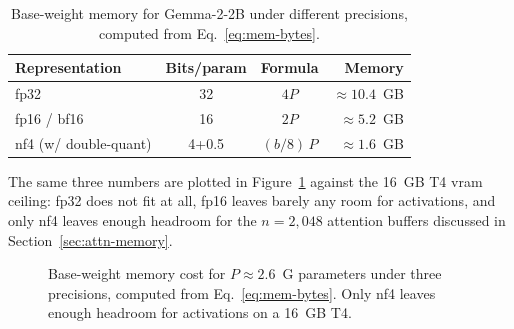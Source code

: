 \documentclass[12pt, a4paper]{report}
\begin{document}
\begin{table}[H]
  \centering
  \caption{Base-weight memory for Gemma-2-2B under different precisions,
           computed from Eq.~\eqref{eq:mem-bytes}.}
  \label{tab:vram-budget}
  \begin{tabular}{@{}lccr@{}}
    \toprule
    \textbf{Representation} & \textbf{Bits/param} & \textbf{Formula} & \textbf{Memory} \\
    \midrule
    fp32                       & 32   & \(4 P\)           & \(\approx 10.4\)~GB \\
    fp16 / bf16                & 16   & \(2 P\)           & \(\approx 5.2\)~GB  \\
    \gls{nf4} (w/ double-quant) & 4{+}0.5 & \((b/8)\,P\) & \(\approx 1.6\)~GB  \\
    \bottomrule
  \end{tabular}
\end{table}

The same three numbers are plotted in Figure~\ref{fig:mem-budget}
against the 16~GB T4 \gls{vram} ceiling: fp32 does not fit at all,
fp16 leaves barely any room for activations, and only \gls{nf4} leaves
enough headroom for the \(n=2{,}048\) attention buffers discussed in
Section~\ref{sec:attn-memory}.

\begin{figure}[H]
  \centering
  \caption[Base-weight memory]{Base-weight memory cost for
           \(P \approx 2.6\)~G parameters under three precisions,
           computed from Eq.~\eqref{eq:mem-bytes}. Only \gls{nf4}
           leaves enough headroom for activations on a 16~GB T4.}
  \label{fig:mem-budget}
\end{figure}
\end{document}

